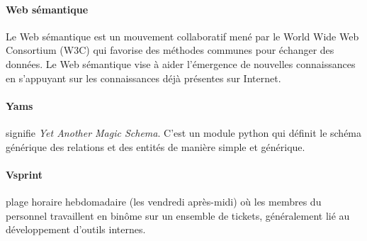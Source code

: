 \documentclass {report}
\begin{document}
\paragraph{Web sémantique}Le Web sémantique est un mouvement collaboratif mené par le World Wide Web Consortium (W3C) qui favorise des méthodes communes pour échanger des données. Le Web sémantique vise à aider l'émergence de nouvelles connaissances en s'appuyant sur les connaissances déjà présentes sur Internet.
\paragraph{Yams}signifie \textit{Yet Another Magic Schema}. C'est un module python qui définit le schéma générique des relations et des entités de manière simple et générique.
\paragraph{Vsprint}plage horaire hebdomadaire (les vendredi après-midi) où les membres du personnel travaillent en binôme sur un ensemble de tickets, généralement lié au développement d'outils internes.
\end{document}
